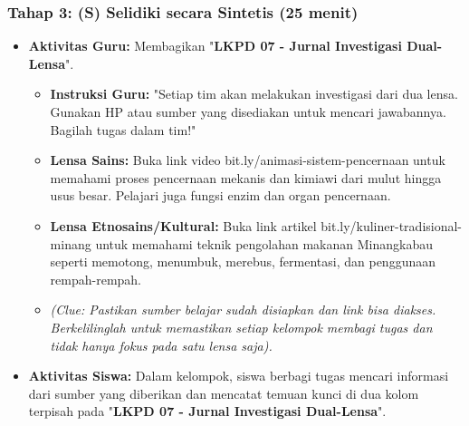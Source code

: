 \documentclass[a4paper,12pt]{article}
\begin{document}
\subsubsection{Tahap 3: (S) Selidiki secara Sintetis (25 menit)}
\begin{itemize}
\item \textbf{Aktivitas Guru:} Membagikan "\textbf{LKPD 07 - Jurnal Investigasi Dual-Lensa}".
    \begin{itemize}
    \item \textbf{Instruksi Guru:} "Setiap tim akan melakukan investigasi dari dua lensa. Gunakan HP atau sumber yang disediakan untuk mencari jawabannya. Bagilah tugas dalam tim!"
    \item \textbf{Lensa Sains:} Buka link video bit.ly/animasi-sistem-pencernaan untuk memahami proses pencernaan mekanis dan kimiawi dari mulut hingga usus besar. Pelajari juga fungsi enzim dan organ pencernaan.
    \item \textbf{Lensa Etnosains/Kultural:} Buka link artikel bit.ly/kuliner-tradisional-minang untuk memahami teknik pengolahan makanan Minangkabau seperti memotong, menumbuk, merebus, fermentasi, dan penggunaan rempah-rempah.
    \item \textit{(Clue: Pastikan sumber belajar sudah disiapkan dan link bisa diakses. Berkelilinglah untuk memastikan setiap kelompok membagi tugas dan tidak hanya fokus pada satu lensa saja).}
    \end{itemize}
\item \textbf{Aktivitas Siswa:} Dalam kelompok, siswa berbagi tugas mencari informasi dari sumber yang diberikan dan mencatat temuan kunci di dua kolom terpisah pada "\textbf{LKPD 07 - Jurnal Investigasi Dual-Lensa}".
\end{itemize}
\end{document}
